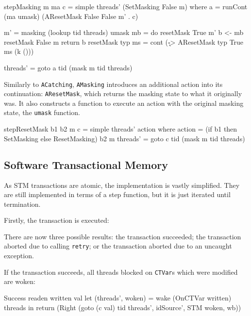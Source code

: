 \begin{haskellcode}
stepMasking m ma c = simple threads' (SetMasking False m)
  where
  a = runCont (ma umask) (AResetMask False False m' . c)

  m' = masking (lookup tid threads)
  umask mb = do
    resetMask True m'
    b <- mb
    resetMask False m
    return b
  resetMask typ ms = cont (\k -> AResetMask typ True ms (k ()))

  threads' = goto a tid (mask m tid threads)
\end{haskellcode}

Similarly to \verb|ACatching|, \verb|AMasking| introduces an
additional action into its continuation: \verb|AResetMask|, which
returns the masking state to what it originally was. It also
constructs a function to execute an action with the original masking
state, the \verb|umask| function.

\begin{haskellcode}
stepResetMask b1 b2 m c = simple threads' action where
  action   = (if b1 then SetMasking else ResetMasking) b2 m
  threads' = goto c tid (mask m tid threads)
\end{haskellcode}

\subsection{Software Transactional Memory}
\label{sec:execution-stepwise-stm}

As STM transactions are atomic, the implementation is vastly
simplified. They are still implemented in terms of a step function,
but it is just iterated until termination.

Firstly, the transaction is executed:


There are now three possible results: the transaction succeeded; the
transaction aborted due to calling \verb|retry|; or the transaction
aborted due to an uncaught exception.

If the transaction succeeds, all threads blocked on \verb|CTVar|s
which were modified are woken:

\begin{haskellcode}
    Success readen written val
      let (threads', woken) = wake (OnCTVar written) threads
      in return (Right
         (goto (c val) tid threads', idSource', STM woken, wb))
\end{haskellcode}

